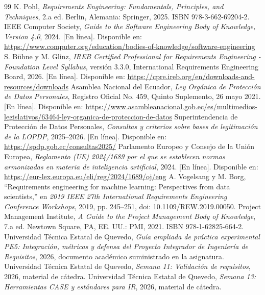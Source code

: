 \begin{thebibliography}{99}
 K. Pohl, \emph{Requirements Engineering: Fundamentals, Principles, and Techniques}, 2.a ed. Berlin, Alemania: Springer, 2025. ISBN 978-3-662-69204-2.
 IEEE Computer Society, \emph{Guide to the Software Engineering Body of Knowledge, Version 4.0}, 2024. [En línea]. Disponible en: \url{https://www.computer.org/education/bodies-of-knowledge/software-engineering}
 S. Bühne y M. Glinz, \emph{IREB Certified Professional for Requirements Engineering - Foundation Level Syllabus}, versión 3.3.0, International Requirements Engineering Board, 2026. [En línea]. Disponible en: \url{https://cpre.ireb.org/en/downloads-and-resources/downloads}
 Asamblea Nacional del Ecuador, \emph{Ley Orgánica de Protección de Datos Personales}, Registro Oficial No. 459, Quinto Suplemento, 26 mayo 2021. [En línea]. Disponible en: \url{https://www.asambleanacional.gob.ec/es/multimedios-legislativos/63464-ley-organica-de-proteccion-de-datos}
 Superintendencia de Protección de Datos Personales, \emph{Consultas y criterios sobre bases de legitimación de la LOPDP}, 2025--2026. [En línea]. Disponible en: \url{https://spdp.gob.ec/consultas2025/}
 Parlamento Europeo y Consejo de la Unión Europea, \emph{Reglamento (UE) 2024/1689 por el que se establecen normas armonizadas en materia de inteligencia artificial}, 2024. [En línea]. Disponible en: \url{https://eur-lex.europa.eu/eli/reg/2024/1689/oj/eng}
 A. Vogelsang y M. Borg, “Requirements engineering for machine learning: Perspectives from data scientists,” en \emph{2019 IEEE 27th International Requirements Engineering Conference Workshops}, 2019, pp. 245--251, doi: 10.1109/REW.2019.00050.
 Project Management Institute, \emph{A Guide to the Project Management Body of Knowledge}, 7.a ed. Newtown Square, PA, EE. UU.: PMI, 2021. ISBN 978-1-62825-664-2.
 Universidad Técnica Estatal de Quevedo, \emph{Guía ampliada de práctica experimental PE5: Integración, métricas y defensa del Proyecto Integrador de Ingeniería de Requisitos}, 2026, documento académico suministrado en la asignatura.
 Universidad Técnica Estatal de Quevedo, \emph{Semana 11: Validación de requisitos}, 2026, material de cátedra.
 Universidad Técnica Estatal de Quevedo, \emph{Semana 13: Herramientas CASE y estándares para IR}, 2026, material de cátedra.
\end{thebibliography}
